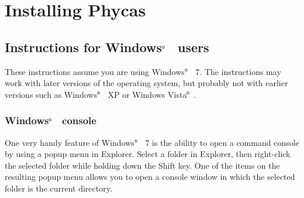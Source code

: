 \documentclass[10pt]{article}
\newcommand{\Windows}{Windows$^{\mbox{\tiny\textregistered}}$ }
\newcommand{\registered}{$^{\mbox{\tiny\textregistered}}$ }
\newcommand{\phycas}{{\sc Phycas}\index{Phycas}}
\begin{document}
\section{Installing \phycas}\label{section:install}

\subsection{Instructions for \Windows\ users} 

These instructions assume you are using \Windows\ 7. The instructions may work with later versions of the operating system, but probably not with earlier versions such as \Windows\ XP or Windows Vista\registered.

\subsubsection{\Windows\ console}
\label{subsubsection:winconsole}
One very handy feature of \Windows\ 7 is the ability to open a command console by using a popup menu in Explorer. Select a folder in Explorer, then right-click the selected folder while holding down the Shift key. One of the items on the resulting popup menu allows you to open a console window in which the selected folder is the current directory.
\end{document}
